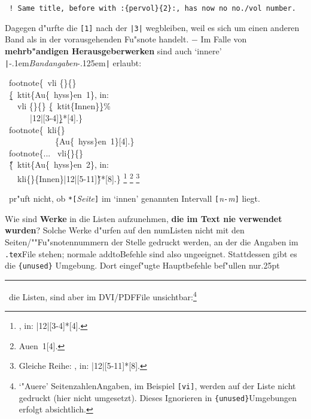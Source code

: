 \documentclass[12pt,a4paper]{article}
\newcommand{\pdfko}[1]{\kern #1pt
                              \rule[-0.4ex]{0.8pt}{0ex}\kern -0.8pt
                          \strut\ignorespaces}%
\newcommand{\pbs}{\string\ \unskip}
\newcommand{\bs}{\protect\pbs}
\begin{document}
\vspace{.5ex}\noindent 
\label{pervol}%
{\small\texttt{ !~Same title, before with :\{pervol\}\{2\}:, has now no no./vol number.}}

\vspace{.75ex}\noindent
Dagegen d"urfte die \verb|[1]| nach der \verb+|3|+ wegbleiben, weil es 
sich um einen anderen Band als in der vorausgehenden 
Fu"snote handelt. $-$ Im Falle von \textbf{mehrb"andigen Herausgeberwerken}
sind auch `innere' \verb+|+\kern-.1em\textit{Bandangaben}\kern-.125em\verb+|+ erlaubt:

\vspace{-.5ex}%
\Doppelbox
{\vspace{.5ex}
 \bs footnote\{\bs vli \{\}\{\}
 \\[.1em] \ \b{\b{\{}}\bs ktit\{Au\{\bs hyss\}en\string~1\}, in:
 \\[.1em] \ \ \bs vli \{\}\{\} \b{\{}\bs ktit\{Innen\}\b{\}}\%
 \\[.2em] \ \ \ \ \ \ \string|12\string|[3-4]\b{\b{\}}}*[4].\}
 \\[1ex] \bs footnote\{\bs kli\{\}
 \\[.1em] \ \ \ \ \ \ \ \ \ \ \ \ \{Au\{\bs hyss\}en\string~1\}[4].\}
 \\[1ex] \bs footnote\{... \bs vli\{\}\{\}
 \\[.1em] \ \H{\{}\bs ktit\{Au\{\bs hyss\}en\string~2\}, in: 
 \\[.2em] \ \ \bs kli\{\}\{Innen\}\string|12\string|[5-11]\H{\}}*[8].\}
 \vspace{.75ex}
}
{\footnote{\notktitaddtok\printonlyvli {}{}%
  {, in:
    \printonlyvli {}{}
        {}%
          |12|[3-4]}*[4].}
 \footnote{\printonlykli{}
              {Au{\hyss}en~1}[4].}
 \footnote{Gleiche Reihe: \notktitaddtok\printonlyvli{}{}
        {, in:
    |12|[5-11]}*[8].}
}

\vspace{-.6ex}\noindent
\BibArts\ pr"uft nicht, ob \hspace{.3em}\verb|*[|\textit{Seite}\verb|]| \hspace{.35em}im 
`innen' genannten Intervall \hspace{.25em}\verb|[|\textit{n}\verb|-|\textit{m}\verb|]| \hspace{.25em}liegt.


\newpage\noindent
Wie sind \textbf{Werke} in die Listen aufzunehmen, \textbf{die im Text nie 
verwendet wurden}? Solche Werke d"urfen auf den num\hy Listen nicht mit den 
Seiten\fhy/""Fu"snotennummern der Stelle gedruckt werden, an der die Angaben 
im \hspace{-.2em}\verb|.tex|\hy File stehen; normale addto\hy Befehle sind also 
ungeeignet. Stattdessen gibt es die  \verb|{unused}|\hy 
Umgebung. Dort eingef"ugte \BibArts\hy Hauptbefehle bef"ullen nur\pdfko{.25}\ 
die Listen, sind aber im DVI\fhy\slash PDF\hy File 
unsichtbar:\footnote{\hspace{.1em}`\ko"Au\hyss ere' Seitenzahlen\hy Angaben, im Beispiel \texttt{[vi]},
werden auf der Liste nicht gedruckt (hier nicht umgesetzt). Dieses Ignorieren 
in \texttt{\{unused\}}\hy Umgebungen erfolgt absichtlich.}
\end{document}
